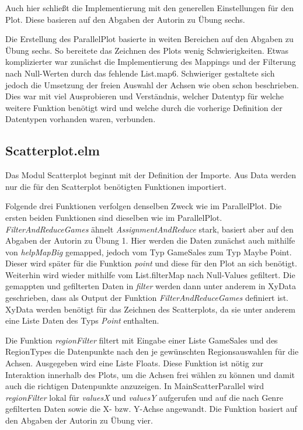 \documentclass[usegeometry=true]{scrartcl}
\begin{document}
Auch hier schließt die Implementierung mit den generellen Einstellungen für den Plot. Diese basieren auf den Abgaben der Autorin zu Übung sechs. 

Die Erstellung des ParallelPlot basierte in weiten Bereichen auf den Abgaben zu Übung sechs. So bereitete das Zeichnen des Plots wenig Schwierigkeiten. 
Etwas komplizierter war zunächst die Implementierung des Mappings und der Filterung nach Null-Werten durch das fehlende List.map6. 
Schwieriger gestaltete sich jedoch die Umsetzung der freien Auswahl der Achsen wie oben schon beschrieben. 
Dies war mit viel Ausprobieren und Verständnis, welcher Datentyp für welche weitere Funktion benötigt wird und welche durch die vorherige Definition der Datentypen vorhanden waren, verbunden.

\subsection{Scatterplot.elm}
Das Modul Scatterplot beginnt mit der Definition der Importe. Aus Data werden nur die für den Scatterplot benötigten Funktionen importiert. 

Folgende drei Funktionen verfolgen denselben Zweck wie im ParallelPlot.
Die ersten beiden Funktionen sind dieselben wie im ParallelPlot.
\textit{FilterAndReduceGames} ähnelt \textit{AssignmentAndReduce} stark, basiert aber auf den Abgaben der Autorin zu Übung 1.
Hier werden die Daten zunächst auch mithilfe von \textit{helpMapBig} gemapped, jedoch vom Typ GameSales zum Typ Maybe Point. 
Dieser wird später für die Funktion \textit{point} und diese für den Plot an sich benötigt.
Weiterhin wird wieder mithilfe vom List.filterMap nach Null-Values gefiltert. 
Die gemappten und gefilterten Daten in \textit{filter} werden dann unter anderem in XyData geschrieben, dass als Output der Funktion \textit{FilterAndReduceGames} definiert ist.
XyData werden benötigt für das Zeichnen des Scatterplots, da sie unter anderem eine Liste Daten des Typs \textit{Point} enthalten.

Die Funktion \textit{regionFilter} filtert mit Eingabe einer Liste GameSales und des RegionTypes die Datenpunkte nach den je gewünschten Regionsauswahlen für die Achsen. 
Ausgegeben wird eine Liste Floats. Diese Funktion ist nötig zur Interaktion innerhalb des Plots, um die Achsen frei wählen zu können und damit auch die richtigen Datenpunkte anzuzeigen.
In MainScatterParallel wird \textit{regionFilter} lokal für \textit{valuesX} und \textit{valuesY} aufgerufen und auf die nach Genre gefilterten Daten sowie die X- bzw. Y-Achse angewandt. 
Die Funktion basiert auf den Abgaben der Autorin zu Übung vier.
\end{document}
